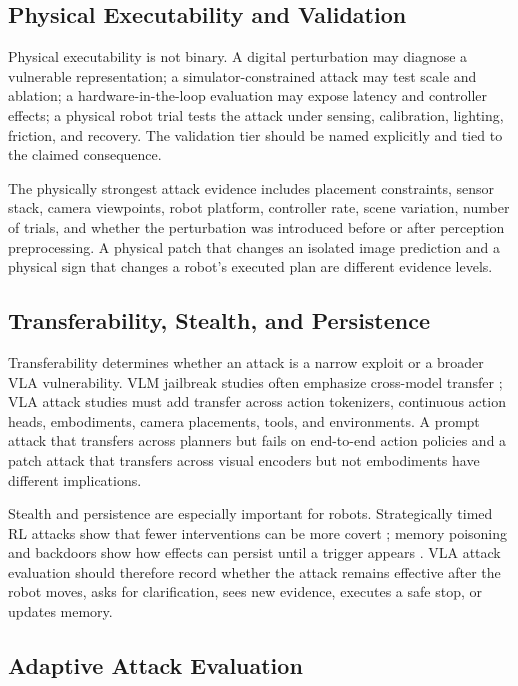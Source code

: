 \subsection{Physical Executability and Validation}

Physical executability is not binary. A digital perturbation may diagnose a vulnerable representation; a simulator-constrained attack may test scale and ablation; a hardware-in-the-loop evaluation may expose latency and controller effects; a physical robot trial tests the attack under sensing, calibration, lighting, friction, and recovery. The validation tier should be named explicitly and tied to the claimed consequence.

The physically strongest attack evidence includes placement constraints, sensor stack, camera viewpoints, robot platform, controller rate, scene variation, number of trials, and whether the perturbation was introduced before or after perception preprocessing. A physical patch that changes an isolated image prediction and a physical sign that changes a robot's executed plan are different evidence levels.

\subsection{Transferability, Stealth, and Persistence}

Transferability determines whether an attack is a narrow exploit or a broader VLA vulnerability. VLM jailbreak studies often emphasize cross-model transfer \cite{qi2024visual,niu2024jailbreaking,li2024hades}; VLA attack studies must add transfer across action tokenizers, continuous action heads, embodiments, camera placements, tools, and environments. A prompt attack that transfers across planners but fails on end-to-end action policies and a patch attack that transfers across visual encoders but not embodiments have different implications.

Stealth and persistence are especially important for robots. Strategically timed RL attacks show that fewer interventions can be more covert \cite{lin2017tactics}; memory poisoning and backdoors show how effects can persist until a trigger appears \cite{zou2025poisonedrag,kiourti2020trojdrl,cui2024badrl}. VLA attack evaluation should therefore record whether the attack remains effective after the robot moves, asks for clarification, sees new evidence, executes a safe stop, or updates memory.

\subsection{Adaptive Attack Evaluation}

